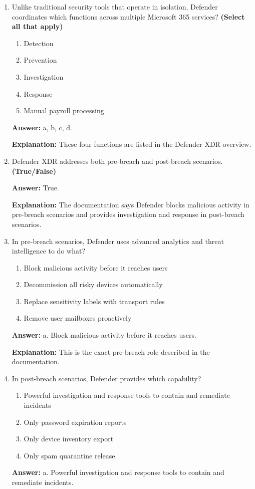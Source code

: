 \documentclass[10pt]{article}
\begin{document}
\begin{enumerate}[leftmargin=*]
\textbf{Explanation:} The documentation defines Microsoft Defender XDR using this exact description.

\item Unlike traditional security tools that operate in isolation, Defender coordinates which functions across multiple Microsoft 365 services? \textbf{(Select all that apply)}
\begin{enumerate}[label=\alph*., leftmargin=1.5em]
\item Detection
\item Prevention
\item Investigation
\item Response
\item Manual payroll processing
\end{enumerate}
\textbf{Answer:} a, b, c, d.

\textbf{Explanation:} These four functions are listed in the Defender XDR overview.

\item Defender XDR addresses both pre-breach and post-breach scenarios. \textbf{(True/False)}

\textbf{Answer:} True.

\textbf{Explanation:} The documentation says Defender blocks malicious activity in pre-breach scenarios and provides investigation and response in post-breach scenarios.

\item In pre-breach scenarios, Defender uses advanced analytics and threat intelligence to do what?
\begin{enumerate}[label=\alph*., leftmargin=1.5em]
\item Block malicious activity before it reaches users
\item Decommission all risky devices automatically
\item Replace sensitivity labels with transport rules
\item Remove user mailboxes proactively
\end{enumerate}
\textbf{Answer:} a. Block malicious activity before it reaches users.

\textbf{Explanation:} This is the exact pre-breach role described in the documentation.

\item In post-breach scenarios, Defender provides which capability?
\begin{enumerate}[label=\alph*., leftmargin=1.5em]
\item Powerful investigation and response tools to contain and remediate incidents
\item Only password expiration reports
\item Only device inventory export
\item Only spam quarantine release
\end{enumerate}
\textbf{Answer:} a. Powerful investigation and response tools to contain and remediate incidents.


\end{enumerate}
\end{document}
